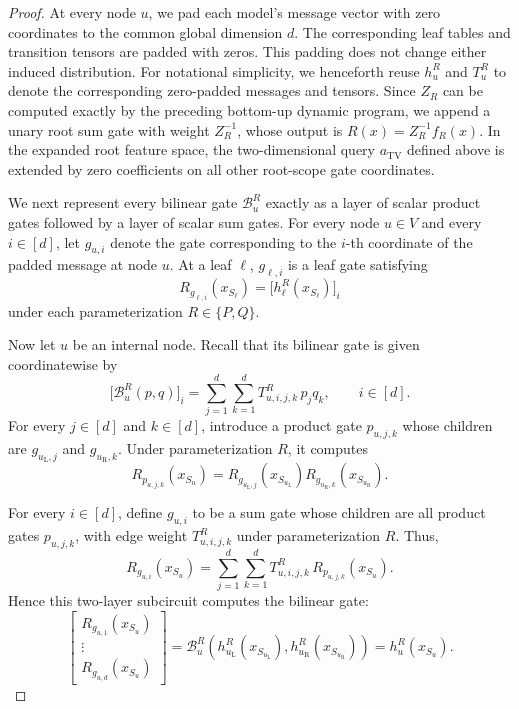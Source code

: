 \documentclass{article}
\begin{document}
\begin{proof}
At every node $u$, we pad each model's message vector with zero coordinates to the common global dimension $d$. The corresponding leaf tables and transition tensors are padded with zeros. This padding does not change either induced distribution. For notational simplicity, we henceforth reuse $h_u^R$ and $T_u^R$ to denote the corresponding zero-padded messages and tensors. Since $Z_R$ can be computed exactly by the preceding bottom-up dynamic program, we append a unary root sum gate with weight $Z_R^{-1}$, whose output is $R(x)=Z_R^{-1}f_R(x)$. In the expanded root feature space, the two-dimensional query $a_{\mathrm{TV}}$ defined above is extended by zero coefficients on all other root-scope gate coordinates.

We next represent every bilinear gate $\mathcal B_u^R$ exactly as a layer of scalar product gates followed by a layer of scalar sum gates. For every node $u\in V$ and every $i\in[d]$, let $g_{u,i}$ denote the gate corresponding to the $i$-th coordinate of the padded message at node $u$. At a leaf $\ell$, $g_{\ell,i}$ is a leaf gate satisfying
$$
R_{g_{\ell,i}}(x_{S_\ell}) = \bigl[h_\ell^R(x_{S_\ell})\bigr]_i
$$
under each parameterization $R\in\{P,Q\}$.

Now let $u$ be an internal node. Recall that its bilinear gate is given coordinatewise by
$$
\bigl[\mathcal B_u^R(p,q)\bigr]_i = \sum_{j=1}^{d}\sum_{k=1}^{d} T_{u,i,j,k}^R\,p_jq_k, \qquad i\in[d].
$$
For every $j\in[d]$ and $k\in[d]$, introduce a product gate $p_{u,j,k}$ whose children are $g_{u_{\mathrm L},j}$ and $g_{u_{\mathrm R},k}$. Under parameterization $R$, it computes
$$
R_{p_{u,j,k}}(x_{S_u}) = R_{g_{u_{\mathrm L},j}}(x_{S_{u_{\mathrm L}}}) R_{g_{u_{\mathrm R},k}}(x_{S_{u_{\mathrm R}}}).
$$

For every $i\in[d]$, define $g_{u,i}$ to be a sum gate whose children are all product gates $p_{u,j,k}$, with edge weight $T_{u,i,j,k}^R$ under parameterization $R$. Thus,
$$
R_{g_{u,i}}(x_{S_u}) = \sum_{j=1}^{d}\sum_{k=1}^{d} T_{u,i,j,k}^R\, R_{p_{u,j,k}}(x_{S_u}).
$$
Hence this two-layer subcircuit computes the bilinear gate:
$$
\begin{bmatrix} R_{g_{u,1}}(x_{S_u})\\ \vdots\\ R_{g_{u,d}}(x_{S_u}) \end{bmatrix} = \mathcal B_u^R\!\left(h_{u_{\mathrm L}}^R(x_{S_{u_{\mathrm L}}}), h_{u_{\mathrm R}}^R(x_{S_{u_{\mathrm R}}})\right) = h_u^R(x_{S_u}).
$$


\end{proof}
\end{document}
